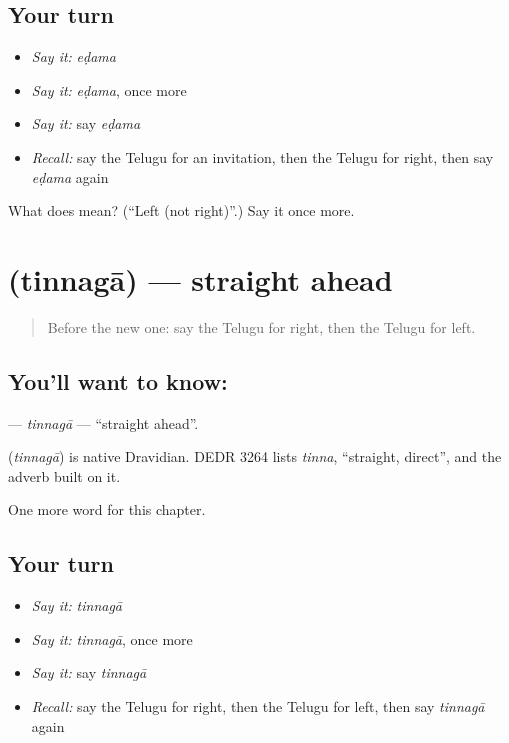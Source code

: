 \subsection*{Your turn}
\begin{itemize}
\raggedright
  \item \emph{Say it:} \emph{eḍama}
  \item \emph{Say it:} \emph{eḍama}, once more
  \item \emph{Say it:} say \emph{eḍama}
  \item \emph{Recall:} say the Telugu for an invitation, then the Telugu for right, then say \emph{eḍama} again
\end{itemize}

\begin{tcolorbox}[breakable,colback=teal!4,colframe=teal!35!black,title={Before you move on}]
What does  mean? (\textquotedblleft{}Left (not right)\textquotedblright{}.) Say it once more.
\end{tcolorbox}
\section[\texorpdfstring{\te{తిన్నగా} (tinnagā)}{తిన్నగా (tinnagā)}]{ (tinnagā) — straight ahead}

\label{lesson:TE-C100-tinnaga}



\begin{quote}
Before the new one: say the Telugu for right, then the Telugu for left.
\end{quote}

\subsection*{You'll want to know: }
\textbf{} — \emph{tinnagā} — \textquotedblleft{}straight ahead\textquotedblright{}.

\begin{cousinweb}
\textbf{} (\emph{tinnagā}) is native Dravidian. DEDR 3264 lists \emph{tinna}, \textquotedblleft{}straight, direct\textquotedblright{}, and the adverb built on it.
\end{cousinweb}

\begin{grammarlens}[title={What you've built}]
One more word for this chapter.
\end{grammarlens}

\subsection*{Your turn}
\begin{itemize}
\raggedright
  \item \emph{Say it:} \emph{tinnagā}
  \item \emph{Say it:} \emph{tinnagā}, once more
  \item \emph{Say it:} say \emph{tinnagā}
  \item \emph{Recall:} say the Telugu for right, then the Telugu for left, then say \emph{tinnagā} again
\end{itemize}

